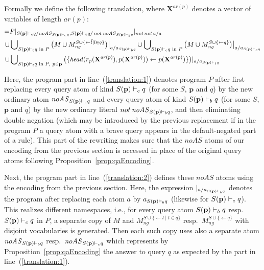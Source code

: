\documentclass[11pt,fleqn,twoside]{article}
\renewcommand{\vec}[1]{\ensuremath{\mb{#1}}}
\newcommand{\mb}[1]{\ensuremath{\mathbf{#1}}}
\def\naf{\ensuremath{\mathop{not}}}
\begin{document}
			Formally we define the following translation, where $\vec{X}^{\mathit{ar}(p)}$ denotes a vector of variables of length $\mathit{ar}(p)$:
			\smallskip
			\newcommand{\replacement}{/}
			\begin{align}
				[P] = & P|_{\queryatom{c}{S}{q}{\vec{p}} \replacement \mathit{noAS}_{\queryatom{c}{S}{q}{\vec{p}}}, \queryatom{b}{S}{q}{\vec{p}} \replacement \naf \mathit{noAS}_{\queryatom{b}{S}{q}{\vec{p}}}}|_{\naf \naf a \replacement a} \label{translation:1} \\
					\cup & \bigcup\nolimits_{\queryatom{b}{S}{q}{\vec{p}} \text{ in } P} \big(M \cup M^{S \cup \{ \leftarrow \bar{l} \mid l \in q \}}_{\mathit{ng}}\big)\big|_{a \replacement a_{\queryatom{b}{S}{q}{\vec{p}}}}
							\cup \bigcup\nolimits_{\queryatom{c}{S}{q}{\vec{p}} \text{ in } P} \big(M \cup M^{S \cup \{ \leftarrow q \}}_{\mathit{ng}}\big)\big|_{a \replacement a_{\queryatom{c}{S}{q}{\vec{p}}}} \label{translation:2} \\
					\cup & \bigcup\nolimits_{\queryatom{t}{S}{q}{\vec{p}} \text{ in } P,\ p \in \vec{p}} \big(\{ \mathit{head}(r_{\mathit{p}}(\vec{X}^{\mathit{ar}(p)}), p(\vec{X}^{\mathit{ar}(p)})) \leftarrow p(\vec{X}^{\mathit{ar}(p)}) \} \big)|_{a \replacement a_{\queryatom{t}{S}{q}{\vec{p}}}} \label{translation:3}
			\end{align}
			\smallskip
			
			Here, the program part in line~(\ref{translation:1}) denotes program $P$ after first replacing
			every query atom of kind $\queryatom{c}{S}{q}{\vec{p}}$ (for some $S$, $\vec{p}$ and $q$) by the new ordinary atom $\mathit{noAS}_{\queryatom{c}{S}{q}{\vec{p}}}$
			and every query atom of kind $\queryatom{b}{S}{q}{\vec{p}}$ (for some $S$, $\vec{p}$ and $q$) by the new ordinary literal $\naf \mathit{noAS}_{\queryatom{b}{S}{q}{\vec{p}}}$,
			and then eliminating double negation (which may be introduced by the previous replacement if in the program $P$ a query atom with a brave query appears in the default-negated part of a rule).
			This part of the rewriting makes sure that the $\mathit{noAS}$ atoms of our encoding from the previous section is accessed in place of the original query atoms following Proposition~\ref{prop:qaEncoding}.
			
			Next, the program part in line~(\ref{translation:2}) defines these $\mathit{noAS}$ atoms using the encoding from the previous section.
			Here, the expression $|_{a \replacement a_{\queryatom{b}{S}{q}{\vec{p}}}}$ denotes the program after replacing each atom $a$ by $a_{\queryatom{b}{S}{q}{\vec{p}}}$ (likewise for $\queryatom{c}{S}{q}{\vec{p}}$).
			This realizes different namespaces, i.e., for every query atom $\queryatom{b}{S}{q}{\vec{p}}$ resp.~$\queryatom{c}{S}{q}{\vec{p}}$ in $P$,
			a separate copy of $M$ and $M^{S \cup \{ \leftarrow \bar{l} \mid l \in q \}}_{\mathit{ng}}$ resp.~$M^{S \cup \{ \leftarrow q \}}_{\mathit{ng}}$
			with disjoint vocabularies is generated. Then each such copy uses also a separate atom $\mathit{noAS}_{\queryatom{b}{S}{q}{\vec{p}}}$ resp.~$\mathit{noAS}_{\queryatom{c}{S}{q}{\vec{p}}}$
			which represents by Proposition~\ref{prop:qaEncoding} the answer to query $q$ as expected by the part in line~(\ref{translation:1}).
\end{document}
